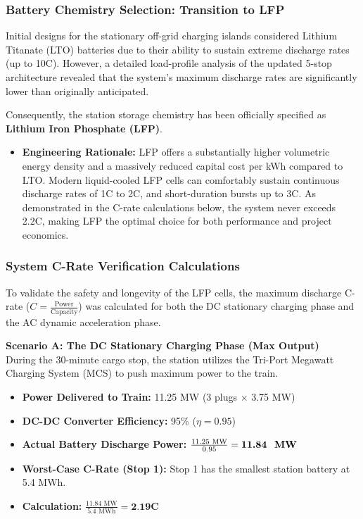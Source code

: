 \subsubsection*{Battery Chemistry Selection: Transition to LFP}
Initial designs for the stationary off-grid charging islands considered Lithium Titanate (LTO) batteries due to their ability to sustain extreme discharge rates (up to 10C). However, a detailed load-profile analysis of the updated 5-stop architecture revealed that the system's maximum discharge rates are significantly lower than originally anticipated. 

Consequently, the station storage chemistry has been officially specified as \textbf{Lithium Iron Phosphate (LFP)}. 
\begin{itemize}
    \item \textbf{Engineering Rationale:} LFP offers a substantially higher volumetric energy density and a massively reduced capital cost per kWh compared to LTO. Modern liquid-cooled LFP cells can comfortably sustain continuous discharge rates of 1C to 2C, and short-duration bursts up to 3C. As demonstrated in the C-rate calculations below, the system never exceeds 2.2C, making LFP the optimal choice for both performance and project economics.
\end{itemize}

\subsubsection*{System C-Rate Verification Calculations}
To validate the safety and longevity of the LFP cells, the maximum discharge C-rate ($C = \frac{\text{Power}}{\text{Capacity}}$) was calculated for both the DC stationary charging phase and the AC dynamic acceleration phase.

\vspace{0.5em}
\noindent\textbf{Scenario A: The DC Stationary Charging Phase (Max Output)} \\
During the 30-minute cargo stop, the station utilizes the Tri-Port Megawatt Charging System (MCS) to push maximum power to the train.
\begin{itemize}
    \item \textbf{Power Delivered to Train:} 11.25 MW (3 plugs $\times$ 3.75 MW)
    \item \textbf{DC-DC Converter Efficiency:} 95\% ($\eta = 0.95$)
    \item \textbf{Actual Battery Discharge Power:} $\frac{11.25 \text{ MW}}{0.95} = \textbf{11.84 \text{ MW}}$
    \item \textbf{Worst-Case C-Rate (Stop 1):} Stop 1 has the smallest station battery at 5.4 MWh.
    \item \textbf{Calculation:} $\frac{11.84 \text{ MW}}{5.4 \text{ MWh}} = \textbf{2.19C}$
\end{itemize}

